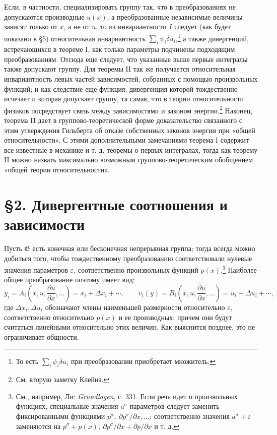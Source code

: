 \documentclass[11pt]{article}
\providecommand{\G}{\mathfrak G}
\providecommand{\eps}{\varepsilon}
\providecommand{\D}{\Delta}
\providecommand{\p}{\partial}
\begin{document}
Если, в частности, специализировать группу так, что в преобразованиях не допускаются производные \(u(x)\), а преобразованные независимые величины зависят только от \(x\), а не от \(u\), то из инвариантности \(I\) следует (как будет показано в \S{}5) относительная инвариантность \(\sum_i\psi_i\delta u_i\),\footnote{То есть \(\sum_i\psi_i\delta u_i\) при преобразовании приобретает множитель.} а также дивергенций, встречающихся в теореме I, как только параметры подчинены подходящим преобразованиям. Отсюда еще следует, что указанные выше первые интегралы также допускают группу. Для теоремы II так же получается относительная инвариантность левых частей зависимостей, собранных с помощью произвольных функций; и как следствие еще функция, дивергенция которой тождественно исчезает и которая допускает группу, та самая, что в теории относительности физиков посредствует связь между зависимостями и законом энергии.\footnote{См. вторую заметку Клейна.} Наконец, теорема II дает в группово-теоретической форме доказательство связанного с этим утверждения Гильберта об отказе собственных законов энергии при «общей относительности». С этими дополнительными замечаниями теорема I содержит все известные в механике и т. д. теоремы о первых интегралах, тогда как теорему II можно назвать максимально возможным группово-теоретическим обобщением «общей теории относительности».

\section*{\S{}2. Дивергентные соотношения и зависимости}

Пусть \(\G\) есть конечная или бесконечная непрерывная группа; тогда всегда можно добиться того, чтобы тождественному преобразованию соответствовали нулевые значения параметров \(\eps\), соответственно произвольных функций \(p(x)\).\footnote{См., например, Ли: \emph{Grundlagen}, с. 331. Если речь идет о произвольных функциях, специальные значения \(a^\sigma\) параметров следует заменить фиксированными функциями \(p^\sigma,\ \p p^\sigma/\p x,\ldots\); соответственно значения \(a^\sigma+\eps\) заменяются на \(p^\sigma+p(x),\ \p p^\sigma/\p x+\p p/\p x\) и т. д.} Наиболее общее преобразование поэтому имеет вид:
\[
y_i=A_i\!\left(x,u,\frac{\p u}{\p x},\ldots\right)=x_i+\D x_i+\cdots,\qquad
v_i(y)=B_i\!\left(x,u,\frac{\p u}{\p x},\ldots\right)=u_i+\D u_i+\cdots,
\]
где \(\D x_i,\D u_i\) обозначают члены наименьшей размерности относительно \(\eps\), соответственно относительно \(p(x)\) и ее производных; причем они будут считаться линейными относительно этих величин. Как выяснится позднее, это не ограничивает общности.
\end{document}
